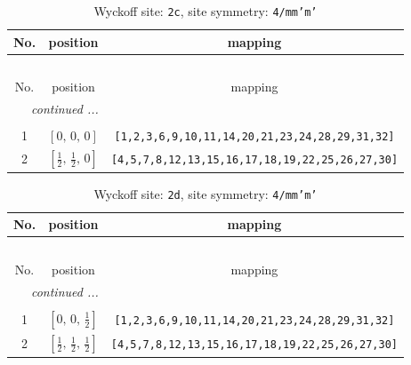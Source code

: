\documentclass[fleqn,8pt]{jsarticle}
\begin{document}
\renewcommand{\arraystretch}{1.2}
\begin{longtable}{ccc}
\caption{Wyckoff site: {\tt 2c}, site symmetry: {\tt 4/mm'm'}}
 \\
 \hline \hline
No. & position & mapping \\ \hline \endfirsthead

\multicolumn{2}{l}{\tablename\ \thetable{}} \\
 \hline \hline
No. & position & mapping \\ \hline \endhead

 \hline \hline
\multicolumn{2}{r}{\footnotesize\it continued ...} \\ \endfoot

 \hline \hline
\multicolumn{2}{r}{} \\ \endlastfoot

1 & $\left[ 0,\, 0,\, 0 \right]$ & {\tt [1,2,3,6,9,10,11,14,20,21,23,24,28,29,31,32]} \\ \hline
2 & $\left[ \frac{1}{2},\, \frac{1}{2},\, 0 \right]$ & {\tt [4,5,7,8,12,13,15,16,17,18,19,22,25,26,27,30]} \\
\end{longtable}
\renewcommand{\arraystretch}{1.2}
\begin{longtable}{ccc}
\caption{Wyckoff site: {\tt 2d}, site symmetry: {\tt 4/mm'm'}}
 \\
 \hline \hline
No. & position & mapping \\ \hline \endfirsthead

\multicolumn{2}{l}{\tablename\ \thetable{}} \\
 \hline \hline
No. & position & mapping \\ \hline \endhead

 \hline \hline
\multicolumn{2}{r}{\footnotesize\it continued ...} \\ \endfoot

 \hline \hline
\multicolumn{2}{r}{} \\ \endlastfoot

1 & $\left[ 0,\, 0,\, \frac{1}{2} \right]$ & {\tt [1,2,3,6,9,10,11,14,20,21,23,24,28,29,31,32]} \\ \hline
2 & $\left[ \frac{1}{2},\, \frac{1}{2},\, \frac{1}{2} \right]$ & {\tt [4,5,7,8,12,13,15,16,17,18,19,22,25,26,27,30]} \\
\end{longtable}
\renewcommand{\arraystretch}{1.2}
\end{document}
